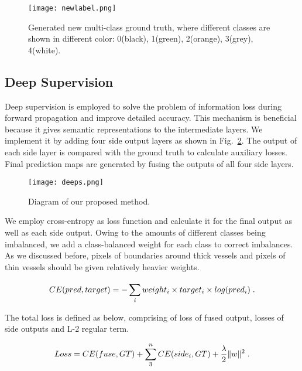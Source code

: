 \documentclass[runningheads,a4paper]{llncs}
\begin{document}
\begin{figure}[h]
	\centering
	\vspace{-10pt}
	\texttt{[image: newlabel.png]}
	\caption{Generated new multi-class ground truth, where different classes are shown in different color: 0(black), 1(green), 2(orange), 3(grey), 4(white). }
	\vspace{-20pt}
	\label{fig:newlabel}
\end{figure}

\subsection{Deep Supervision}

Deep supervision \cite{lee2015deeply} is employed to solve the problem of information loss during forward propagation and improve detailed accuracy. This mechanism is beneficial because it gives semantic representations to the intermediate layers. We implement it by adding four side output layers as shown in Fig.~\ref{fig:deeps}. The output of each side layer is compared with the ground truth to calculate auxiliary losses. Final prediction maps are generated by fusing the outputs of all four side layers.

\begin{figure}[h]
	\centering
	\vspace{-15pt}
	\texttt{[image: deeps.png]}
	\caption{Diagram of our proposed method. }
	\vspace{-15pt}
	\label{fig:deeps}
\end{figure}

We employ cross-entropy as loss function and calculate it for the final output as well as each side output. Owing to the amounts of different classes being imbalanced, we add a class-balanced weight for each class to correct imbalances. As we discussed before, pixels of boundaries around thick vessels and pixels of thin vessels should be given relatively heavier weights.

\begin{equation}
	\vspace{-10pt}
	CE(pred,target) = - \sum_{i}^{}weight_{i}\times target_{i}\times log(pred_{i}) \; .
	\vspace{-0pt}
\end{equation}

The total loss is defined as below, comprising of loss of fused output, losses of side outputs and L-2 regular term.

\begin{equation}
	\vspace{-10pt}
	Loss = CE(fuse,GT) + \sum_{3}^{n}CE(side_{i},GT) + \frac{\lambda}{2} \|w\|^{2} \;.
	\vspace{-5pt}
\end{equation}
\end{document}
